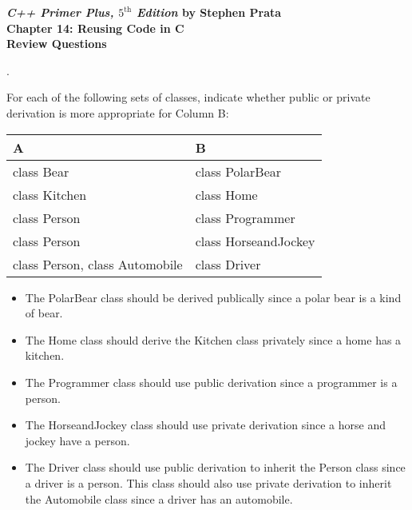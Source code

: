 \documentclass{amsart}
\begin{document}
\begin{center}
	\Large {\bfseries
	\emph{C++ Primer Plus, $5^{\text{th}}$ Edition} by Stephen Prata \\
	Chapter 14: Reusing Code in C\raisebox{.15ex}{++} \\
	Review Questions} \normalsize \vspace{5ex}
\end{center}


\vfill
{}. 
\begin{minipage}[t]{11.5 cm}
	For each of the following sets of classes, indicate whether public 
	or private derivation is more appropriate for Column B: \\
	\begin{center}
		\begin{tabular}{l l}
			\hline
			A 		& B \\ \hline
			class Bear	& class PolarBear \\ \hline
			class Kitchen	& class Home \\ \hline
			class Person	& class Programmer \\ \hline
			class Person	& class HorseandJockey \\ \hline
			class Person, class Automobile & class Driver \\ \hline
		\end{tabular}
	\end{center}
\end{minipage}
\vfill
\phantom{3. } 
\begin{minipage}[t]{11.5 cm}
	{\slshape 
		\begin{itemize}
			\item 
				The PolarBear class should be derived publically since a
				polar bear is a kind of bear.
			\item
				The Home class should derive the Kitchen class privately since
				a home has a kitchen.
			\item
				The Programmer class should use public derivation since
				a programmer is a person.
			\item
				The HorseandJockey class should use private derivation since
				a horse and jockey have a person.
			\item
				The Driver class should use public derivation to inherit the
				Person class since a driver is a person. 
				This class should also use private derivation to inherit the 
				Automobile class since a driver has an automobile. 
		\end{itemize}
	} 
\end{minipage} 
\vfill
\newpage
\end{document}
